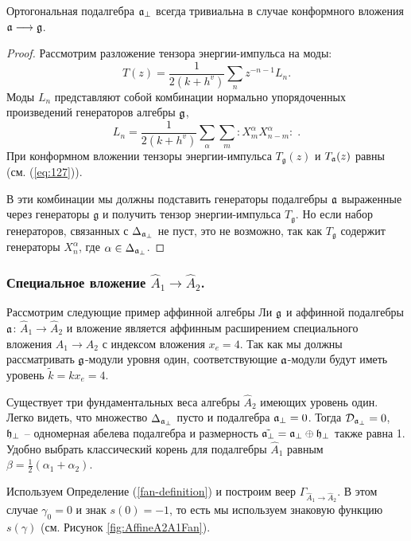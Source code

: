 \begin{mynote} Ортогональная подалгебра  $\mathfrak{a}_{\perp}$ всегда тривиальна в случае конформного вложения $\mathfrak{a}\longrightarrow \mathfrak{g}$.
\begin{proof}
Рассмотрим разложение тензора энергии-импульса на моды:
\begin{equation*}
\label{eq:47}
  T(z)=\frac{1}{2(k+h^v)}\sum_n z^{-n-1}L_n.
\end{equation*}
Моды $L_n$ представляют собой комбинации нормально упорядоченных произведений генераторов алгебры $\mathfrak{g}$,
\begin{equation*}
\label{eq:48}
  L_n=\frac{1}{2(k+h^v)}\sum_{\alpha}\sum_m:X^{\alpha}_m X^{\alpha}_{n-m}: \; .
\end{equation*}
При конформном вложении тензоры энергии-импульса  $T_{\mathfrak{g}}(z)$ и $T_{\mathfrak{a}}(z)$ равны (см. (\ref{eq:127})).

В эти комбинации мы должны подставить генераторы подалгебры $\mathfrak{a}$ выраженные через генераторы $\mathfrak{g}$ и получить тензор энергии-импульса $T_{\mathfrak{g}}$. Но если набор генераторов, связанных с  $\Delta_{\mathfrak{a}_{\perp}}$ не пуст, это не возможно, так как  $T_{\mathfrak{g}}$ содержит генераторы $X^{\alpha}_n$, где $\alpha\in \Delta_{\mathfrak{a}_{\perp}}$.
\end{proof}
\end{mynote}



\subsubsection{Специальное вложение $\hat{A}_1\rightarrow\hat{A}_2$.}
\label{sec:spec-embedd-hata_1s}
Рассмотрим следующие пример аффинной алгебры Ли $\mathfrak{g}$ и аффинной подалгебры $\mathfrak{a}$:
$\hat{A}_1 \rightarrow \hat{A}_2$ и вложение является аффинным расширением специального вложения $A_1 \rightarrow A_2$ с индексом вложения $x_e=4$. Так как мы должны рассматривать $\mathfrak{g}$-модули уровня один, соответствующие  $\mathfrak{a}$-модули будут иметь уровень $\tilde{k}=kx_e=4$.

Существует три фундаментальных веса алгебры  $\hat{A}_2$ имеющих уровень один. 
Легко видеть, что множество $\Delta_{ \mathfrak{a}_{\perp} }$ пусто и подалгебра $\mathfrak{a}_{\perp}=0$. Тогда ${\cal D}_{\mathfrak{a}_{\perp}}=0$, $\mathfrak{h}_{\perp}$ -- одномерная абелева подалгебра и размерность $\tilde{\mathfrak{a}_{\perp}}=\mathfrak{a}_{\perp}\oplus \mathfrak{h}_{\perp}$ также равна 1. Удобно выбрать классический корень для подалгебры $\hat{A}_1$ равным $\beta=\frac{1}{2}(\alpha_1+\alpha_2)$.

Используем Определение (\ref{fan-definition}) и построим веер $\Gamma_{\hat A_1\to\hat A_2}$. В этом случае $\gamma_0 =0$ и знак  $s\left( 0 \right)=-1$, то есть мы используем знаковую функцию $s(\gamma)$ (см. Рисунок \ref{fig:AffineA2A1Fan}).



